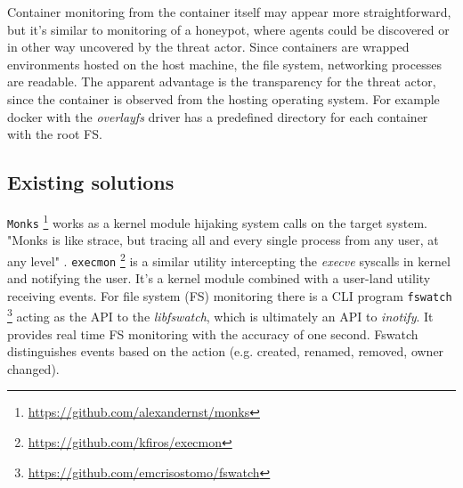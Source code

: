 Container monitoring from the container itself may appear more straightforward, but it's similar to monitoring of a honeypot, where agents could be discovered or in other way uncovered by the threat actor. Since containers are wrapped environments hosted on the host machine, the file system, networking processes are readable. The apparent advantage is the transparency for the threat actor, since the container is observed from the hosting operating system. For example docker with the \textit{overlayfs} driver has a predefined directory for each container with the root FS.

\subsection{Existing solutions \label{anal:mon:exist}}
\texttt{Monks} \footnote{\url{https://github.com/alexandernst/monks}} works as a kernel module hijaking system calls on the target system. "Monks is like strace, but tracing all and every single process from any user, at any level" \cite{git:monks}. \texttt{execmon} \footnote{\url{https://github.com/kfiros/execmon}} is a similar utility intercepting the \textit{execve} syscalls in kernel and notifying the user. It's a kernel module combined with a user-land utility receiving events. For file system (FS) monitoring there is a CLI program \texttt{fswatch} \footnote{\url{https://github.com/emcrisostomo/fswatch}} acting as the API to the \textit{libfswatch}, which is ultimately an API to \textit{inotify}. It provides real time FS monitoring with the accuracy of one second. Fswatch distinguishes events based on the action (e.g. created, renamed, removed, owner changed).